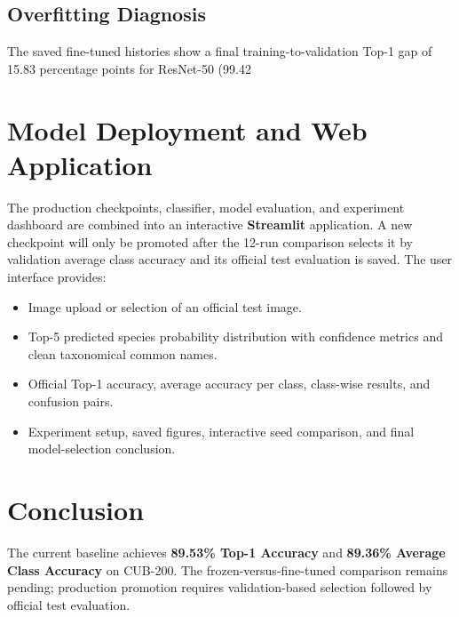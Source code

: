 \documentclass[10pt,twocolumn,letterpaper]{article}
\begin{document}
\subsection{Overfitting Diagnosis}
The saved fine-tuned histories show a final training-to-validation Top-1 gap of 15.83 percentage points for ResNet-50 (99.42%

\section{Model Deployment and Web Application}
The production checkpoints, classifier, model evaluation, and experiment
dashboard are combined into an interactive \textbf{Streamlit} application. A
new checkpoint will only be promoted after the 12-run comparison selects it by
validation average class accuracy and its official test evaluation is saved.
The user interface provides:
\begin{itemize}
    \item Image upload or selection of an official test image.
    \item Top-5 predicted species probability distribution with confidence metrics and clean taxonomical common names.
    \item Official Top-1 accuracy, average accuracy per class, class-wise results, and confusion pairs.
    \item Experiment setup, saved figures, interactive seed comparison, and final model-selection conclusion.
\end{itemize}

\section{Conclusion}
The current baseline achieves \textbf{89.53\% Top-1 Accuracy} and \textbf{89.36\% Average Class Accuracy} on CUB-200. The frozen-versus-fine-tuned comparison remains pending; production promotion requires validation-based selection followed by official test evaluation.
\end{document}
